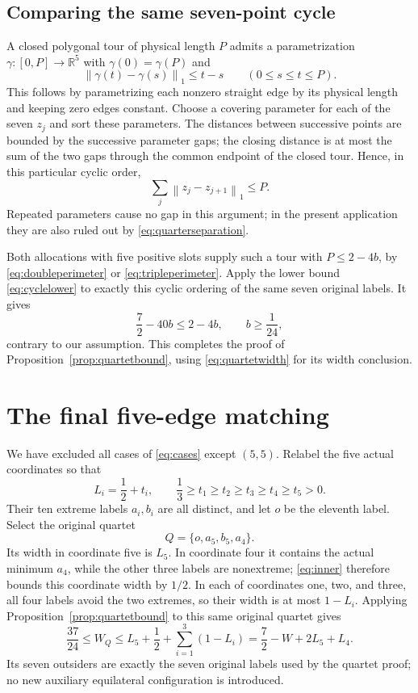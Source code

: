\documentclass[11pt]{article}
\theoremstyle{definition}
\theoremstyle{remark}
\newcommand{\R}{\mathbb R}
\newcommand{\norm}[1]{\left\lVert#1\right\rVert_1}
\begin{document}
\subsection{Comparing the same seven-point cycle}

A closed polygonal tour of physical length $P$ admits a parametrization
$\gamma:[0,P]\longrightarrow\R^5$ with $\gamma(0)=\gamma(P)$ and
\[
 \norm{\gamma(t)-\gamma(s)}\leq t-s\qquad(0\leq s\leq t\leq P).
\]
This follows by parametrizing each nonzero straight edge by its physical
length and keeping zero edges constant. Choose a covering parameter for
each of the seven $z_j$ and sort these parameters. The distances between
successive points are bounded by the successive parameter gaps; the
closing distance is at most the sum of the two gaps through the common
endpoint of the closed tour. Hence, in this particular cyclic order,
\[
 \sum_j\norm{z_j-z_{j+1}}\leq P.
\]
Repeated parameters cause no gap in this argument; in the present
application they are also ruled out by
\eqref{eq:quarterseparation}.

Both allocations with five positive slots supply such a tour with
$P\leq2-4b$, by \eqref{eq:doubleperimeter} or
\eqref{eq:tripleperimeter}. Apply the lower bound
\eqref{eq:cyclelower} to exactly this cyclic ordering of the same
seven original labels. It gives
\[
 \frac72-40b\leq2-4b,
 \qquad b\geq\frac1{24},
\]
contrary to our assumption. This completes the proof of
Proposition~\ref{prop:quartetbound}, using
\eqref{eq:quartetwidth} for its width conclusion.

\section{The final five-edge matching}\label{sec:finalmatching}

We have excluded all cases of \eqref{eq:cases} except $(5,5)$. Relabel
the five actual coordinates so that
\[
 L_i=\frac12+t_i,\qquad
 \frac13\geq t_1\geq t_2\geq t_3\geq t_4\geq t_5>0.
\]
Their ten extreme labels $a_i,b_i$ are all distinct, and let $o$ be
the eleventh label. Select the original quartet
\[
 Q=\{o,a_5,b_5,a_4\}.
\]
Its width in coordinate five is $L_5$. In coordinate four it contains
the actual minimum $a_4$, while the other three labels are nonextreme;
\eqref{eq:inner} therefore bounds this coordinate width by $1/2$.
In each of coordinates one, two, and three, all four labels avoid the
two extremes, so their width is at most $1-L_i$. Applying
Proposition~\ref{prop:quartetbound} to this same original quartet gives
\begin{equation}\label{eq:selectedwidth}
 \frac{37}{24}\leq W_Q
 \leq L_5+\frac12+\sum_{i=1}^3(1-L_i)
 =\frac72-W+2L_5+L_4.
\end{equation}
Its seven outsiders are exactly the seven original labels used by the
quartet proof; no new auxiliary equilateral configuration is introduced.
\end{document}
